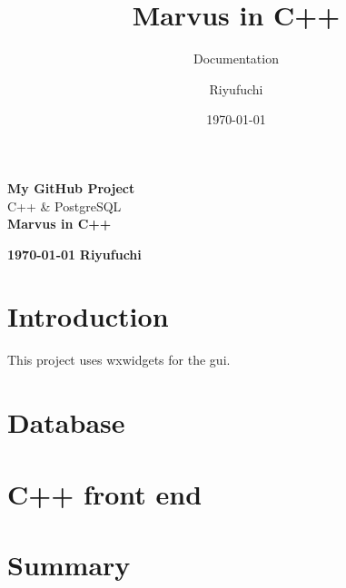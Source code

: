 \documentclass[12pt,a4paper,titlepage]{scrreprt}
\title{\vspace{6cm}Marvus in C++}
\subtitle{Documentation}
\author{Riyufuchi}
\date{\today}
\begin{document}
	
	
	\begin{titlepage}
		\begin{center}
			{\Large \textbf{My GitHub Project}} \\
			{\Large C++ \& PostgreSQL} \\
			\vfill
			{\Huge \textbf{Marvus in C++}}
			\vfill
		\end{center}
		{\large\textbf{ \today}} \hfill {\large \textbf{Riyufuchi}}
	\end{titlepage}
	

	
	\tableofcontents
	\newpage
	
	\chapter{Introduction}
	This project uses \gls{wxwidgets} for the \gls{gui}.
	
		\clearpage
\printglossary[type=main, title=Glossary]
\printglossary[type=\acronymtype, style=mystyle]
	
	\chapter{Database}
	\chapter{C++ front end}
	\chapter*{Summary}
\end{document}
